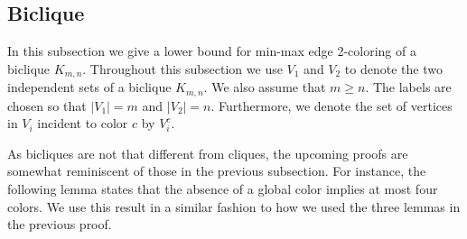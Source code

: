 \documentclass[runningheads, a4paper]{llncs}
\begin{document}
\subsection{Biclique}\label{sssect:biclique}

In this subsection we give a lower bound for min-max edge 2-coloring of a biclique $K_{m,n}$. Throughout this subsection we use $V_1$ and $V_2$ to denote the two independent sets of a biclique $K_{m,n}$. We also assume that $m \geq n$. The labels are chosen so that $|V_1| = m$ and $|V_2| = n$. Furthermore, we denote the set of vertices in $V_i$ incident to color $c$ by $V_i^c$.

As bicliques are not that different from cliques, the upcoming proofs are somewhat reminiscent of those in the previous subsection. For instance, the following lemma states that the absence of a global color implies at most four colors. We use this result in a similar fashion to how we used the three lemmas in the previous proof.
\end{document}
